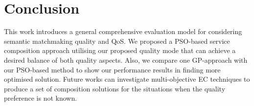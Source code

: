 \documentclass{llncs}
\begin{document}
\section{Conclusion}\label{conclusion}
This work introduces a general comprehensive evaluation model for considering semantic matchmaking quality and QoS. We proposed a PSO-based service composition approach utilising our proposed quality mode that can achieve a desired balance of both quality aspects. Also, we compare one GP-approach with our PSO-based method to show our performance results in finding more optimised solution. Future works can investigate multi-objective EC techniques to produce a set of composition solutions for the situations when the quality preference is not known.




\end{document}
